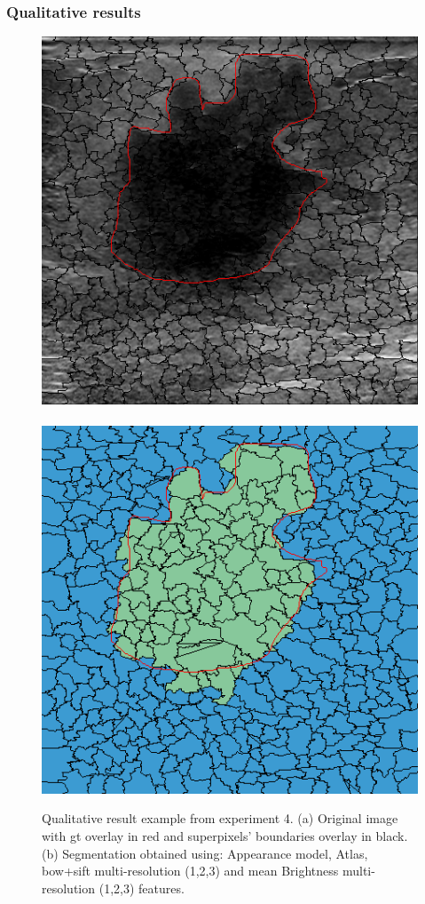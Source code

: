 \begin{frame}\frametitle{Qualitative results}
\begin{figure}[Htbp]
\centering
\includegraphics[width=.45\textwidth]{qualitativeResults/goodQSorigin}~
\includegraphics[width=.45\textwidth]{qualitativeResults/goodQSseg}
\caption[Qualitative result example from experiment 4.]{Qualitative result example from experiment 4. (a) Original image with \ac{gt} overlay in red and superpixels' boundaries overlay in black. (b) Segmentation obtained  using: Appearance model, Atlas, \ac{bow}+\ac{sift} multi-resolution (1,2,3) and mean Brightness multi-resolution (1,2,3) features. }
\end{figure}
\end{frame}

